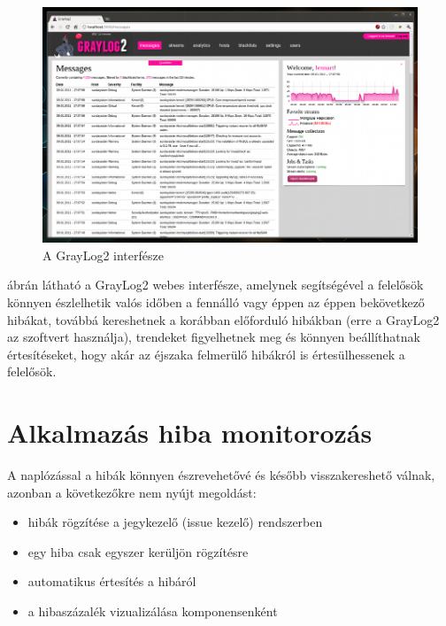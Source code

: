 \begin{figure}[ht]
	\centering
		\includegraphics[scale=0.5]{assets/graylog2.png}%
		\caption[DUMMY]%
		{A GrayLog2 interfésze}%
		\label{fig:graylog2-webinterface}
\end{figure}

 ábrán látható a GrayLog2 webes interfésze, amelynek segítségével a felelősök könnyen észlelhetik valós időben a fennálló vagy éppen az éppen bekövetkező hibákat, továbbá kereshetnek a korábban előforduló hibákban (erre a GrayLog2 az   szoftvert használja), trendeket figyelhetnek meg és könnyen beállíthatnak értesítéseket, hogy akár az éjszaka felmerülő hibákról is értesülhessenek a felelősök.

\section{Alkalmazás hiba monitorozás\\}
A naplózással a hibák könnyen észrevehetővé és később visszakereshető válnak, azonban a következőkre nem nyújt megoldást:\\
\begin{itemize}
\item hibák rögzítése a jegykezelő (issue kezelő) rendszerben
\item egy hiba csak egyszer kerüljön rögzítésre
\item automatikus értesítés a hibáról
\item a hibaszázalék vizualizálása komponensenként
\end{itemize}

